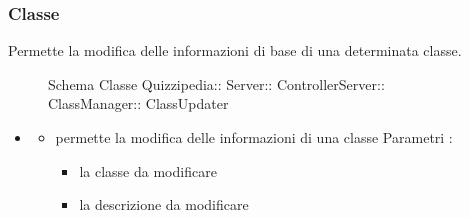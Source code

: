 \subsubsection{Classe }
Permette la modifica delle informazioni di base di una determinata classe.
\begin{figure}[H]
\centering
\noindent{}
\caption[Schema Classe ClassUpdater]{Schema Classe Quizzipedia:: Server:: ControllerServer:: ClassManager:: ClassUpdater}
\end{figure}
\begin{itemize}
\item {}
\begin{itemize}
\item {}
\newline
permette la modifica delle informazioni di una classe
\newline
Parametri :
\begin{itemize}
\item {}
\newline
la classe da modificare
\item {}
\newline
la descrizione da modificare
\end{itemize}
\end{itemize}
\end{itemize}
